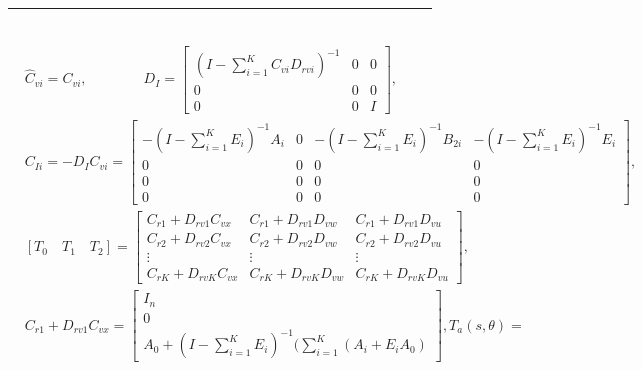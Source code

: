 \documentclass[twocolumn]{autart}    %
\begin{document}
\begin{figure}[htb]
    \flushleft
    {\noindent}	 \rule[-10pt]{17.5cm}{0.05em}\\
    \vspace{1.5em}
    \begin{equation}
        \begin{aligned}
            &\hat{C}_{vi} = C_{vi},    \quad \quad \quad \quad  D_{I} = 
                                            \begin{bmatrix}
                                                (I-\sum_{i=1}^{K}C_{vi}D_{rvi})^{-1} & 0 & 0 \\
                                                0 & 0 & 0 \\
                                                0 & 0 & I
                                            \end{bmatrix}  ,            \\
            &C_{Ii} = -D_{I}C_{vi} = \begin{bmatrix}
                -(I-\sum_{i=1}^{K}E_{i})^{-1}A_{i} & 0 & -(I-\sum_{i=1}^{K}E_{i})^{-1}B_{2i} & -(I-\sum_{i=1}^{K}E_{i})^{-1}E_{i} \\
                0 & 0 & 0 & 0\\
                0 & 0 & 0 & 0\\
                0 & 0 & 0 & 0
                \end{bmatrix}
                ,           \\   
            &[T_{0} \quad T_{1} \quad T_{2}] = \begin{bmatrix}
                C_{r1}+D_{rv1}C_{vx} & C_{r1}+D_{rv1}D_{vw}  & C_{r1}+D_{rv1}D_{vu}  \\
                C_{r2}+D_{rv2}C_{vx} & C_{r2}+D_{rv2}D_{vw}  & C_{r2}+D_{rv2}D_{vu}  \\
                \vdots & \vdots & \vdots \\
                C_{rK}+D_{rvK}C_{vx} & C_{rK}+D_{rvK}D_{vw}  & C_{rK}+D_{rvK}D_{vu}   
            \end{bmatrix},\\
            &C_{r1}+D_{rv1}C_{vx} = 
            \begin{bmatrix}
            I_{n}    \\
            0        \\
            A_{0}+(I-\sum_{i=1}^{K}E_{i})^{-1}(\sum_{i=1}^{K}(A_{i}+E_{i}A_{0})
            \end{bmatrix},T_{a}(s,\theta) = 

\end{aligned}
\end{equation}
\end{figure}
\end{document}
